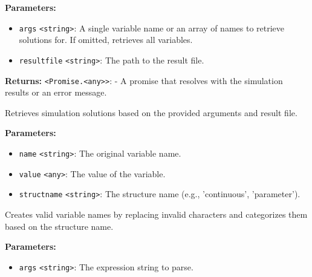 \documentclass[12pt,a4paper]{article}
\begin{document}
\vspace{5mm}
\noindent {}


\noindent \textbf{Parameters:}
\begin{itemize}
  \item \texttt{args} \texttt{<string>}: A single variable name or an array of names to retrieve solutions for. If omitted, retrieves all variables.
  \item \texttt{resultfile} \texttt{<string>}: The path to the result file.
\end{itemize}

\noindent \textbf{Returns:} \texttt{<Promise.<any>>}: - A promise that resolves with the simulation results or an error message.

\noindent Retrieves simulation solutions based on the provided arguments and result file.

\vspace{5mm}
\noindent {}


\noindent \textbf{Parameters:}
\begin{itemize}
  \item \texttt{name} \texttt{<string>}: The original variable name.
  \item \texttt{value} \texttt{<any>}: The value of the variable.
  \item \texttt{structname} \texttt{<string>}: The structure name (e.g., 'continuous', 'parameter').
\end{itemize}

\noindent Creates valid variable names by replacing invalid characters and categorizes them based on the structure name.

\vspace{5mm}
\noindent {}


\noindent \textbf{Parameters:}
\begin{itemize}
  \item \texttt{args} \texttt{<string>}: The expression string to parse.
\end{itemize}
\end{document}
